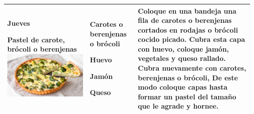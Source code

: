 \documentclass[menu.tex]{subfiles}
\begin{document}
\begin{tabular} {p{3.5cm} p{4cm} p{9cm}}
\pbox{20cm}
{
\rule{0pt}{3ex}\begin{large}\textbf{Jueves}\end{large}\\
\rule{0pt}{2ex}Pastel de carote,\\ brócoli o berenjenas\\
\includegraphics[scale=0.42]{pastel-brocoli}
} & 
\vspace{-1.6cm}
\begin{compactitem} 
\begin{footnotesize}
\item Carotes o berenjenas o brócoli
\item Huevo
\item Jamón
\item Queso
\end{footnotesize}
\end{compactitem}&
\vspace{-1.6cm}
Coloque en una bandeja una fila de carotes o berenjenas cortados en rodajas o brócoli cocido picado. Cubra esta capa con huevo, coloque jamón, vegetales y queso rallado. Cubra nuevamente con carotes, berenjenas o brócoli, De este modo coloque capas hasta formar un pastel del tamaño que le agrade y hornee.\\
\hline


\end{tabular}
\end{document}
